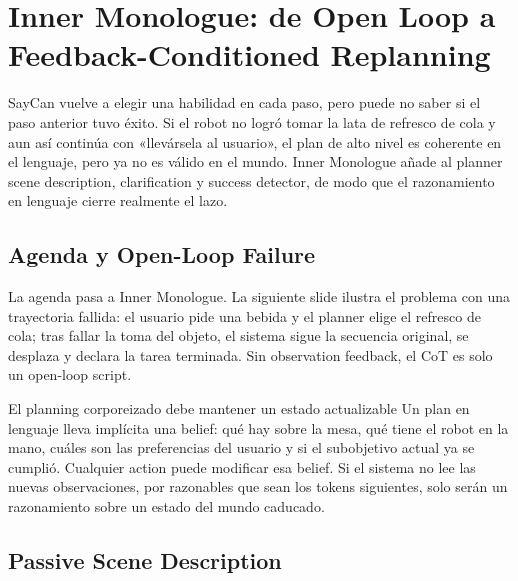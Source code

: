 \section{Inner Monologue: de Open Loop a Feedback-Conditioned Replanning}

SayCan vuelve a elegir una habilidad en cada paso, pero puede no saber si el paso anterior tuvo éxito. Si el robot no logró tomar la lata de refresco de cola y aun así continúa con «llevársela al usuario», el plan de alto nivel es coherente en el lenguaje, pero ya no es válido en el mundo. Inner Monologue añade al planner scene description, clarification y success detector, de modo que el razonamiento en lenguaje cierre realmente el lazo.

\subsection{Agenda y Open-Loop Failure}

La agenda pasa a Inner Monologue. La siguiente slide ilustra el problema con una trayectoria fallida: el usuario pide una bebida y el planner elige el refresco de cola; tras fallar la toma del objeto, el sistema sigue la secuencia original, se desplaza y declara la tarea terminada. Sin observation feedback, el CoT es solo un open-loop script.



\begin{importantbox}{El planning corporeizado debe mantener un estado actualizable}
Un plan en lenguaje lleva implícita una belief: qué hay sobre la mesa, qué tiene el robot en la mano, cuáles son las preferencias del usuario y si el subobjetivo actual ya se cumplió. Cualquier action puede modificar esa belief. Si el sistema no lee las nuevas observaciones, por razonables que sean los tokens siguientes, solo serán un razonamiento sobre un estado del mundo caducado.
\end{importantbox}

\subsection{Passive Scene Description}

